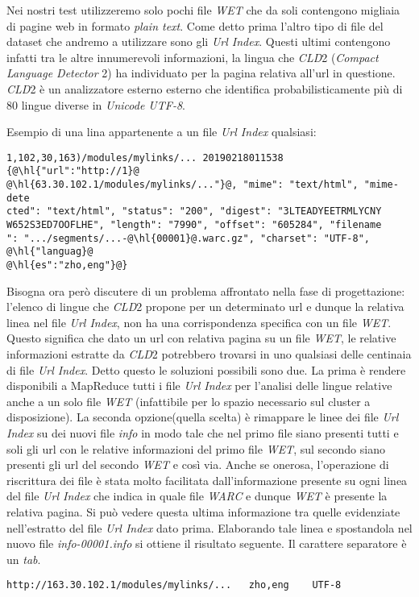 \documentclass{article}
\newcommand{\MR}{MapReduce}
\newcommand{\cld}{\textit{CLD}2}
\newcommand{\WET}{\textit{WET}}
\newcommand{\UrlIndex}{\textit{Url Index}}
\newcommand{\info}{\textit{info}}
\newcommand{\pt}{\textit{plain text}}
\newcommand{\filename}[1]{\textit{#1}}
\begin{document}
Nei nostri test utilizzeremo solo pochi file \WET{} che da soli contengono migliaia di pagine web in formato \pt{}. Come detto prima l'altro tipo di file del dataset che andremo a utilizzare sono gli \UrlIndex{}. Questi ultimi contengono infatti tra le altre innumerevoli informazioni, la lingua che \cld{} (\textit{Compact Language Detector} 2) ha individuato per la pagina relativa all'url in questione. \cld{} è un analizzatore esterno esterno che identifica probabilisticamente più di 80 lingue diverse in \textit{Unicode UTF-8}.

Esempio di una lina appartenente a un file \UrlIndex{} qualsiasi:
\begin{verbatim}
1,102,30,163)/modules/mylinks/... 20190218011538 {@\hl{"url":"http://1}@
@\hl{63.30.102.1/modules/mylinks/..."}@, "mime": "text/html", "mime-dete
cted": "text/html", "status": "200", "digest": "3LTEADYEETRMLYCNY
W652S3ED7OOFLHE", "length": "7990", "offset": "605284", "filename
": ".../segments/...-@\hl{00001}@.warc.gz", "charset": "UTF-8", @\hl{"languag}@
@\hl{es":"zho,eng"}@}
\end{verbatim}

Bisogna ora però discutere di un problema affrontato nella fase di progettazione: l'elenco di lingue che \cld{} propone per un determinato url e dunque la relativa linea nel file \UrlIndex{}, non ha una corrispondenza specifica con un file \WET{}. Questo significa che dato un url con relativa pagina su un file \WET{}, le relative informazioni estratte da \cld{} potrebbero trovarsi in uno qualsiasi delle centinaia di file \UrlIndex{}. Detto questo le soluzioni possibili sono due. La prima è rendere disponibili a \MR{} tutti i file \UrlIndex{} per l'analisi delle lingue relative anche a un solo file \WET{} (infattibile per lo spazio necessario sul cluster a disposizione). La seconda opzione(quella scelta) è rimappare le linee dei file \UrlIndex{} su dei nuovi file \info{} in modo tale che nel primo file siano presenti tutti e soli gli url con le relative informazioni del primo file \WET{}, sul secondo siano presenti gli url del secondo \WET{} e così via.
Anche se onerosa, l'operazione di riscrittura dei file è stata molto facilitata dall'informazione presente su ogni linea del file \UrlIndex{} che indica in quale file \textit{WARC} e dunque \WET{} è presente la relativa pagina. Si può vedere questa ultima informazione tra quelle evidenziate nell'estratto del file \UrlIndex{} dato prima. Elaborando tale linea e spostandola nel nuovo file \filename{info-00001.info} si ottiene il risultato seguente. Il carattere separatore è un \textit{tab}.
\begin{verbatim}
http://163.30.102.1/modules/mylinks/...   zho,eng    UTF-8 
\end{verbatim}
\end{document}
